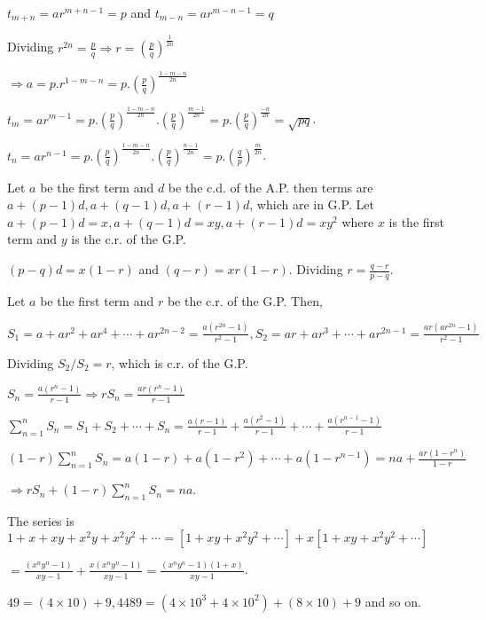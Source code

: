   $t_{m + n} = ar^{m + n - 1} = p$ and $t_{m - n} = ar^{m - n - 1} = q$

  Dividing $r^{2n} = \frac{p}{q} \Rightarrow r = \left(\frac{p}{q}\right)^{\tfrac{1}{2n}}$

  $\Rightarrow a = p.r^{1 - m - n} = p.\left(\frac{p}{q}\right)^{\tfrac{1 - m - n}{2n}}$

  $t_m = ar^{m - 1} = p.\left(\frac{p}{q}\right)^{\tfrac{1 - m -
      n}{2n}}.\left(\frac{p}{q}\right)^{\tfrac{m - 1}{2n}} = p.\left(\frac{p}{q}\right)^{\tfrac{- n}{2n}} = \sqrt{pq}$.

  $t_n = ar^{n - 1} = p.\left(\frac{p}{q}\right)^{\tfrac{1 - m -
      n}{2n}}.\left(\frac{p}{q}\right)^{\tfrac{n - 1}{2n}} =
  p.\left(\frac{q}{p}\right)^{\tfrac{m}{2n}}$.
\item Let $a$ be the first term and $d$ be the c.d. of the A.P. then terms are $a + (p - 1)d, a + (q - 1)d,
  a + (r - 1)d$, which are in G.P. Let $a + (p - 1)d = x, a + (q - 1)d = xy, a + (r - 1)d = xy^2$ where $x$
  is the first term and $y$ is the c.r. of the G.P.

  $(p - q)d = x(1 - r)$ and $(q - r) = xr(1 - r)$. Dividing $r = \frac{q - r}{p - q}$.
\item Let $a$ be the first term and $r$ be the c.r. of the G.P. Then,

  $S_1 = a + ar^2 + ar^4 + \cdots + ar^{2n - 2} = \frac{a(r^{2n} - 1)}{r^2 - 1}, S_2 = ar + ar^3 + \cdots +
  ar^{2n - 1} = \frac{ar(ar^{2n} - 1)}{r^2 - 1}$

  Dividing $S_2/S_2 = r$, which is c.r. of the G.P.
\item $S_n = \frac{a(r^n - 1)}{r - 1} \Rightarrow rS_n = \frac{ar(r^n - 1)}{r - 1}$

  $\displaystyle\sum_{n = 1}^nS_n = S_1 + S_2 + \cdots + S_n = \frac{a(r - 1)}{r - 1} + \frac{a(r^2 - 1)}{r
  - 1} + \cdots + \frac{a(r^{n - 1} - 1)}{r - 1}$

  $\displaystyle(1 - r)\sum_{n = 1}^nS_n = a(1 - r) + a(1 - r^2) + \cdots + a(1 - r^{n - 1}) = na +
  \frac{ar(1 - r^n)}{1 - r}$

  $\Rightarrow rS_n + (1 - r)\sum_{n = 1}^nS_n = na$.
\item The series is $1 + x + xy + x^2y + x^2y^2 + \cdots = [1 + xy + x^2y^2 + \cdots] + x[1 + xy + x^2y^2 +
  \cdots]$

  $= \frac{(x^ny^n - 1)}{xy - 1} + \frac{x(x^ny^n - 1)}{xy - 1} = \frac{(x^ny^n - 1)(1 + x)}{xy - 1}$.
\item $49 = (4\times10) + 9, 4489 = (4\times10^3 + 4\times10^2) + (8\times10) + 9$ and so on.

